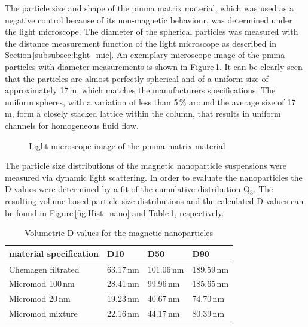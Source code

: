 The particle size and shape of the \gls{pmma} matrix material, which was used as a negative control because of its non-magnetic behaviour, was determined under the light microscope. The diameter of the spherical particles was measured with the distance measurement function of the light microscope as described in Section\,\ref{subsubsec:light_mic}. An exemplary microscope image of the \gls{pmma} particles with diameter measurements is shown in Figure\,\ref{fig:PMMA}. It can be clearly seen that the particles are almost perfectly spherical and of a uniform size of approximately 17\,\textmu m, which matches the manufacturers specifications. The uniform spheres, with a variation of less than 5\,\% around the average size of 17\,\textmu m, form a closely stacked lattice within the column, that results in uniform channels for homogeneous fluid flow.

\begin{figure}[h]
\centering

\caption[Light microscope image of \gls{pmma}]{Light microscope image of the \gls{pmma} matrix material
\label{fig:PMMA}
}
\end{figure}

The particle size distributions of the magnetic nanoparticle suspensions were measured via dynamic light scattering. In order to evaluate the nanoparticles the D-values were determined by a fit of the cumulative distribution Q$_{3}$. The resulting volume based particle size distributions and the calculated D-values can be found in Figure\,\ref{fig:Hist_nano} and Table\,\ref{table:D_values}, respectively.

\begin{table}[h]
\centering
\caption[Volumetric D-values for the magnetic nanoparticles]{Volumetric D-values for the magnetic nanoparticles}
\label{table:D_values}
\begin{tabularx}{\textwidth}{XXXX}\hline
material specification & D10  & D50 & D90  \\
\hline\hline
Chemagen filtrated & 63.17\,nm & 101.06\,nm & 189.59\,nm \\
Micromod 100\,nm & 28.41\,nm & 99.96\,nm & 185.65\,nm \\
Micromod 20\,nm & 19.23\,nm & 40.67\,nm & 74.70\,nm \\
Micromod mixture & 22.16\,nm & 44.17\,nm & 80.39\,nm \\
\hline
\end{tabularx}
\end{table}  

